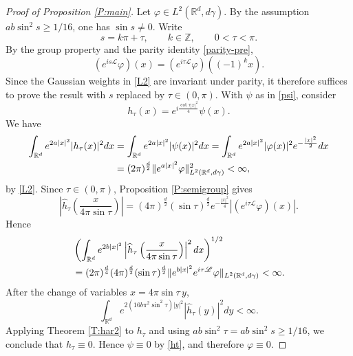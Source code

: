 \documentclass[10pt,a4paper]{amsart}
\newcommand{\Rm}{\mathbb R^d}
\def \vf{\varphi}
\begin{document}
\begin{proof}[Proof of Proposition \ref{P:main}]
Let $\vf\in L^2(\Rm,d\gamma)$. By the assumption
$ab\sin^2s\geq 1/16$, one has $\sin s\neq0$. Write
\[
s=k\pi+\tau,
\qquad k\in\mathbb Z,
\qquad 0<\tau<\pi.
\]
By the group property and the parity identity \eqref{parity-pre},
\[
(e^{is\mathscr L}\vf)(x)
=(e^{i\tau\mathscr L}\vf)((-1)^k x).
\]
Since the Gaussian weights in \eqref{L2} are invariant under parity,
it therefore suffices to prove the result with $s$ replaced by
$\tau\in(0,\pi)$. With $\psi$ as in \eqref{psi}, consider
\begin{equation}\label{ht}
h_\tau(x)=e^{i\frac{\cot\tau |x|^2}{4}}\psi(x).
\end{equation}
We have
\begin{align}\label{one}
\int_{\Rm}e^{2a|x|^2}|h_\tau(x)|^2dx
&=\int_{\Rm}e^{2a|x|^2}|\psi(x)|^2dx
=\int_{\Rm}e^{2a|x|^2}|\vf(x)|^2e^{-\frac{|x|^2}{2}}dx
\\
&=(2\pi)^{\frac d2}\|e^{a|x|^2}\vf\|^2_{L^2(\Rm,d\gamma)}<\infty,
\notag
\end{align}
by \eqref{L2}. Since $\tau\in(0,\pi)$, Proposition \ref{P:semigroup}
gives
\begin{equation*}
\left|\widehat h_\tau\left(\frac{x}{4\pi\sin\tau}\right)\right|
=(4\pi)^{\frac d2}(\sin\tau)^{\frac d2}
e^{-\frac{|x|^2}{4}}|(e^{i\tau\mathscr L}\vf)(x)|.
\end{equation*}
Hence
\begin{align}\label{beauty}
&\left(\int_{\Rm}e^{2b|x|^2}
\left|\widehat h_\tau\left(\frac{x}{4\pi\sin\tau}\right)\right|^2dx\right)^{1/2}
\\
&=(2\pi)^{\frac d4}(4\pi)^{\frac d2}(\sin\tau)^{\frac d2}
\|e^{b|x|^2}e^{i\tau\mathscr L}\vf\|_{L^2(\Rm,d\gamma)}<\infty.
\notag
\end{align}
After the change of variables $x=4\pi\sin\tau\,y$,
\begin{equation}\label{nik}
\int_{\Rm}e^{2(16b\pi^2\sin^2\tau)|y|^2}
|\widehat h_\tau(y)|^2dy<\infty.
\end{equation}
Applying Theorem \ref{T:har2} to $h_\tau$ and using
$ab\sin^2\tau=ab\sin^2s\geq1/16$, we conclude that
$h_\tau\equiv0$. Hence $\psi\equiv0$ by \eqref{ht}, and therefore
$\vf\equiv0$.
\end{proof}
\end{document}
